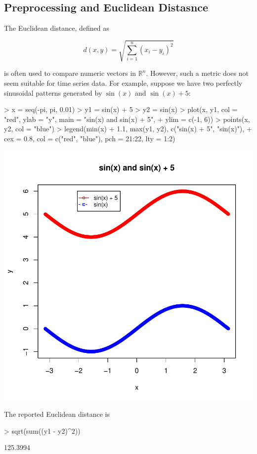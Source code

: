 \documentclass{article}
\begin{document}
\subsection{Preprocessing and Euclidean Distasnce}

The Euclidean distance, defined as

$$d(x,y) = \sqrt{ \sum_{i=1}^n{ (x_i - y_i)^2 } }$$

is often used to compare numeric vectors in $\mathbb{R}^n$.  However, such a 
metric does not seem suitable for time series data.  For example, suppose we 
have two perfectly sinusoidal patterns generated by $\sin(x)$ and $\sin(x) + 5$:

\begin{Schunk}
\begin{Sinput}
> x = seq(-pi, pi, 0.01)
> y1 = sin(x) + 5
> y2 = sin(x)
> plot(x, y1, col = "red", ylab = "y", main = "sin(x) and sin(x) + 5", 
+     ylim = c(-1, 6))
> points(x, y2, col = "blue")
> legend(min(x) + 1.1, max(y1, y2), c("sin(x) + 5", "sin(x)"), 
+     cex = 0.8, col = c("red", "blue"), pch = 21:22, lty = 1:2)
\end{Sinput}
\end{Schunk}
\includegraphics{tsclust-002}

The reported Euclidean distance is 
\begin{Schunk}
\begin{Sinput}
> sqrt(sum((y1 - y2)^2))
\end{Sinput}
\begin{Soutput}
[1] 125.3994
\end{Soutput}
\end{Schunk}
\end{document}
